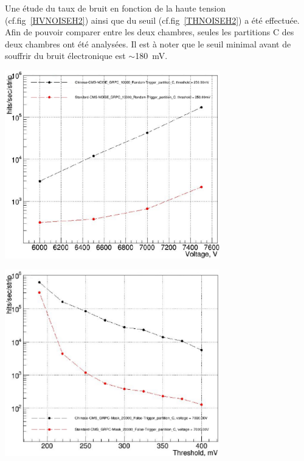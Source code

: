 Une étude du taux de bruit en fonction de la haute tension (cf.fig~\ref{HVNOISEH2}) ainsi que du seuil (cf.fig~\ref{THNOISEH2}) a été effectuée. Afin de pouvoir comparer entre les deux chambres, seules les partitions C des deux chambres ont été analysées.
Il est à noter que le seuil minimal avant de souffrir du bruit électronique est $\sim$\SI{180}{\milli\volt}.

\noindent
\begin{minipage}[th!]{0.98\textwidth}
	\noindent
	\centering
	\includegraphics[width=0.70\textwidth]{GLA/HVNOISEH2.png}
	\label{HVNOISEH2}
\end{minipage}%


\noindent
\begin{minipage}[th!]{0.98\textwidth}
	\noindent
	\centering
	\includegraphics[width=0.70\textwidth]{GLA/THNOISEH2.png}
	\label{THNOISEH2}
\end{minipage}%

